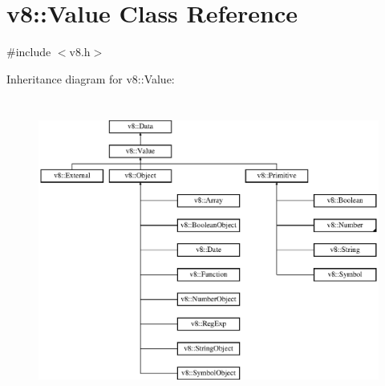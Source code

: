 \hypertarget{classv8_1_1_value}{}\section{v8\+:\+:Value Class Reference}
\label{classv8_1_1_value}


{\ttfamily \#include $<$v8.\+h$>$}

Inheritance diagram for v8\+:\+:Value\+:\begin{figure}[H]
\begin{center}
\leavevmode
\includegraphics[height=10.016260cm]{classv8_1_1_value}
\end{center}
\end{figure}
